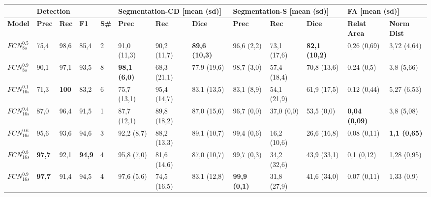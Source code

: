 \documentclass[a4paper,authoryear,review]{elsarticle}
\begin{document}
\begin{table}[]
	\tiny
	\centering
	\begin{adjustbox}{angle=90}
		\begin{tabular}{lllllllllllll}
			\hline
			\multicolumn{1}{|l|}{\textbf{}} & \multicolumn{4}{l|}{\textbf{Detection}} & \multicolumn{3}{l|}{\textbf{Segmentation-CD [mean (sd)]}} & \multicolumn{3}{l|}{\textbf{Segmentation-S [mean (sd)]}} & \multicolumn{2}{l|}{\textbf{FA [mean (sd)]}} \\ \hline
			\multicolumn{1}{|l|}{\textbf{Model}} & \multicolumn{1}{l|}{\textbf{Prec}} & \multicolumn{1}{l|}{\textbf{Rec}} & \multicolumn{1}{l|}{\textbf{F1}} & \multicolumn{1}{l|}{\textbf{S\#}} & \multicolumn{1}{l|}{\textbf{Prec}} & \multicolumn{1}{l|}{\textbf{Rec}} & \multicolumn{1}{l|}{\textbf{Dice}} & \multicolumn{1}{l|}{\textbf{Prec}} & \multicolumn{1}{l|}{\textbf{Rec}} & \multicolumn{1}{l|}{\textbf{Dice}} & \multicolumn{1}{l|}{\textbf{Relat Area}} & \multicolumn{1}{l|}{\textbf{Norm Dist}} \\ \hline
			$FCN_{8s}^{0.5}$ & 75,4 & 98,6 & 85,4 & 2 & 91,0 (11,3) & 90,2 (11,7) & \cellcolor[HTML]{81D41A}\textbf{89,6 (10,3)} & 96,6 (2,2) & 73,1 (17,6) & \cellcolor[HTML]{81D41A}\textbf{82,1 (10,2)} & 0,26 (0,69) & 3,72 (4,64) \\
			$FCN_{8s}^{0.9}$ & 90,1 & 97,1 & 93,5 & 8 & \cellcolor[HTML]{81D41A}\textbf{98,1 (6,0)} & 68,3 (21,1) & 77,9 (19,6) & 98,7 (3,0) & 57,4 (18,4) & 70,8 (13,6) & 0,24 (0,5) & 3,8 (5,66) \\
			$FCN_{16s}^{0.1}$ & 71,3 & \cellcolor[HTML]{81D41A}\textbf{100} & 83,2 & 6 & 75,7 (13,1) & 95,4 (14,7) & 83,1 (13,5) & 83,1 (8,9) & 54,1 (21,9) & 61,9 (17,5) & 0,12 (0,44) & 5,27 (6,53) \\
			$FCN_{16s}^{0.4}$ & 87,0 & 96,4 & 91,5 & 1 & 87,7 (12,1) & 89,8 (18,2) & 87,0 (15,6) & 96,7 (0,0) & 37,0 (0,0) & 53,5 (0,0) & \cellcolor[HTML]{81D41A}\textbf{0,04 (0,09)} & 3,8 (5,08) \\
			$FCN_{16s}^{0.6}$ & 95,6 & 93,6 & 94,6 & 3 & 92,2 (8,7) & 88,2 (13,3) & 89,1 (10,7) & 99,4 (0,6) & 16,2 (10,6) & 26,6 (16,8) & 0,08 (0,11) & \cellcolor[HTML]{81D41A}\textbf{1,1 (0,65)} \\
			$FCN_{16s}^{0.8}$ & \cellcolor[HTML]{81D41A}\textbf{97,7} & 92,1 & \cellcolor[HTML]{81D41A}\textbf{94,9} & 4 & 95,8 (7,0) & 81,6 (14,6) & 87,0 (10,7) & 99,7 (0,3) & 34,2 (32,6) & 43,9 (33,1) & 0,1 (0,12) & 1,28 (0,95) \\
			$FCN_{16s}^{0.9}$ & \cellcolor[HTML]{81D41A}\textbf{97,7} & 91,4 & 94,5 & 4 & 97,6 (5,6) & 74,5 (16,5) & 83,1 (12,8) & \cellcolor[HTML]{81D41A}\textbf{99,9 (0,1)} & 31,8 (27,9) & 41,6 (34,0) & 0,07 (0,11) & 1,33 (0,9) \\

\end{tabular}
\end{adjustbox}
\end{table}
\end{document}
